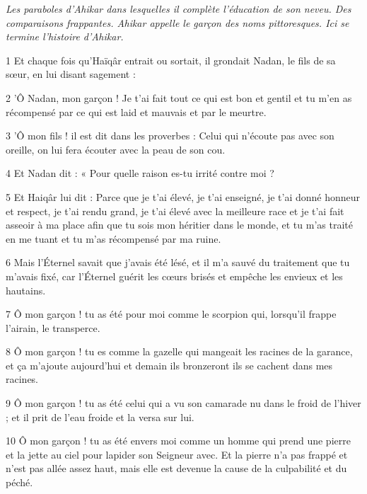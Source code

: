 \par \textit{Les paraboles d'Ahikar dans lesquelles il complète l'éducation de son neveu. Des comparaisons frappantes. Ahikar appelle le garçon des noms pittoresques. Ici se termine l'histoire d'Ahikar.}

\par 1 Et chaque fois qu'Haïqâr entrait ou sortait, il grondait Nadan, le fils de sa sœur, en lui disant sagement :

\par 2 'Ô Nadan, mon garçon ! Je t'ai fait tout ce qui est bon et gentil et tu m'en as récompensé par ce qui est laid et mauvais et par le meurtre.

\par 3 'Ô mon fils ! il est dit dans les proverbes : Celui qui n'écoute pas avec son oreille, on lui fera écouter avec la peau de son cou.

\par 4 Et Nadan dit : « Pour quelle raison es-tu irrité contre moi ?

\par 5 Et Haiqâr lui dit : Parce que je t'ai élevé, je t'ai enseigné, je t'ai donné honneur et respect, je t'ai rendu grand, je t'ai élevé avec la meilleure race et je t'ai fait asseoir à ma place afin que tu sois mon héritier dans le monde, et tu m'as traité en me tuant et tu m'as récompensé par ma ruine.

\par 6 Mais l'Éternel savait que j'avais été lésé, et il m'a sauvé du traitement que tu m'avais fixé, car l'Éternel guérit les cœurs brisés et empêche les envieux et les hautains.

\par 7 Ô mon garçon ! tu as été pour moi comme le scorpion qui, lorsqu'il frappe l'airain, le transperce.

\par 8 Ô mon garçon ! tu es comme la gazelle qui mangeait les racines de la garance, et ça m'ajoute aujourd'hui et demain ils bronzeront ils se cachent dans mes racines.

\par 9 Ô mon garçon ! tu as été celui qui a vu son camarade nu dans le froid de l'hiver ; et il prit de l'eau froide et la versa sur lui.

\par 10 Ô mon garçon ! tu as été envers moi comme un homme qui prend une pierre et la jette au ciel pour lapider son Seigneur avec. Et la pierre n’a pas frappé et n’est pas allée assez haut, mais elle est devenue la cause de la culpabilité et du péché.

